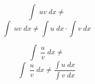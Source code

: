 \documentclass[avery5371,grid]{flashcards}
\begin{document}
\begin{flashcard}{\large \vspace*{\fill} \[ \int\; uv \;dx \neq \] \vspace*{\fill}   }{\large \vspace*{\fill} \[  \int\; uv \;dx \neq \int u \;dx \cdot \int v \;dx  \] \vspace*{\fill}   }\end{flashcard}

\begin{flashcard}{\large \vspace*{\fill} \[ \int\; \dfrac{u}{v} \;dx \neq \] \vspace*{\fill}   }{\large \vspace*{\fill} \[  \int\;\dfrac{u}{v} \;dx \neq \dfrac{\int u \; dx}{\int v \;dx}  \] \vspace*{\fill}   }\end{flashcard}
\end{document}
